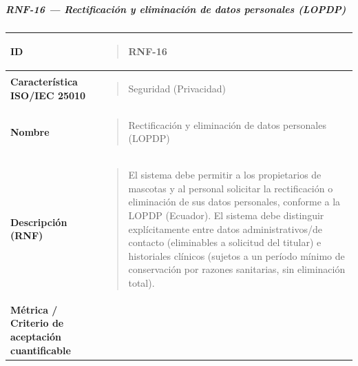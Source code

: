 \documentclass[
]{article}
\newcounter{none} %
\begin{document}
\subparagraph{RNF-16 --- Rectificación y eliminación de datos
personales (LOPDP)}\label{rnf-16-rectificacion-y-eliminacion-de-datos-personales-lopdp}

{\def\LTcaptype{none} %
\begin{longtable}[]{@{}
  >{\raggedright\arraybackslash}p{}
  >{\raggedright\arraybackslash}p{}@{}}
\toprule\noalign{}
\begin{minipage}[b]{\linewidth}\raggedright
\textbf{ID}
\end{minipage} & \begin{minipage}[b]{\linewidth}\raggedright
\begin{quote}
RNF-16
\end{quote}
\end{minipage} \\
\midrule\noalign{}
\endhead
\bottomrule\noalign{}
\endlastfoot
\textbf{Característica ISO/IEC 25010} & \begin{minipage}[t]{\linewidth}\raggedright
\begin{quote}
Seguridad (Privacidad)
\end{quote}
\end{minipage} \\
\textbf{Nombre} & \begin{minipage}[t]{\linewidth}\raggedright
\begin{quote}
Rectificación y eliminación de datos personales (LOPDP)
\end{quote}
\end{minipage} \\
\textbf{Descripción (RNF)} & \begin{minipage}[t]{\linewidth}\raggedright
\begin{quote}
El sistema debe permitir a los propietarios de mascotas y al personal
solicitar la rectificación o eliminación de sus datos personales,
conforme a la LOPDP (Ecuador). El sistema debe distinguir
explícitamente entre datos administrativos/de contacto (eliminables a
solicitud del titular) e historiales clínicos (sujetos a un período
mínimo de conservación por razones sanitarias, sin eliminación total).
\end{quote}
\end{minipage} \\
\textbf{Métrica / Criterio de aceptación cuantificable} & \begin{minipage}[t]{\linewidth}\raggedright
\begin{quote}

\end{quote}
\end{minipage}
\end{longtable}}
\end{document}
